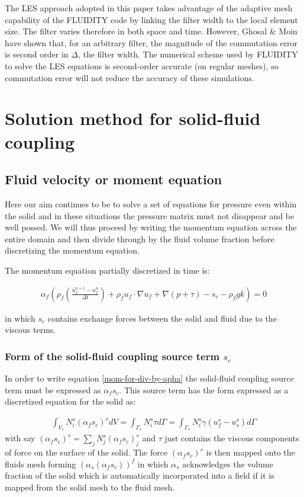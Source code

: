 The LES approach adopted in this paper takes advantage of the
adaptive mesh capability of the FLUIDITY code by linking the
filter width to the local element size. The filter varies
therefore in both space and time. However, Ghosal \& Moin
\cite{GnM95} have shown that, for an arbitrary filter, the
magnitude of the commutation error is second order in $\Delta$,
the filter width. The numerical scheme used by FLUIDITY to solve
the LES equations is second-order accurate (on regular meshes), so
commutation error will not reduce the accuracy of these
simulations.




\section{Solution method for solid-fluid coupling} 



\subsection{Fluid velocity or moment equation} 
Here our aim continues to be to solve a set of equations 
for pressure even within the solid and in these situations 
the pressure matrix must not disappear and be well possed. 
We will thus proceed by writing the momentum equation 
across the entire domain and then divide through by the 
fluid volume fraction before discretizing the momentum equation. 

The momentum equation partially discretized in time is:

\begin{eqnarray}
\alpha_f ( \rho_f (\frac{u_f^{n+1}-u_f^n}{\Delta t})
+ \rho_f u_f\cdot \nabla u_f 
+\nabla (p+\tau)  -s_c -\rho_f g k)=0
\label{mom-for-div-by-apha}
\end{eqnarray}

in which $s_c$ contains exchange forces between the 
solid and fluid due to the viscous terms. 

\subsubsection{Form of the solid-fluid coupling source term $s_c$}
In order to write equation \ref{mom-for-div-by-apha} 
the solid-fluid coupling source term must be expressed 
as $\alpha_f s_c$. 
This source term has the form expressed as a discretized equation 
for the solid as: 

\begin{eqnarray}
\int_{V_s} N_i^s (\alpha_f s_c)^s dV= \int_{\Gamma_s} N_i^s \tau d\Gamma = \int_{\Gamma_s} N_i^s \gamma (u^s_f - u^s_s) d\Gamma
\end{eqnarray}
with say $(\alpha_f s_c)^s=\sum_j N_j^s (\alpha_f s_c)^s_j$ 
and $\tau$ just contains the viscous components of force 
on the surface of the solid. The force $(\alpha_f s_c)^s$ is 
then mapped onto the fluids mesh forming $(\alpha_s(\alpha_f s_c))^f$ 
in which $\alpha_s$ acknowledges the volume fraction of the 
solid which is automatically incorporated into 
a field if it is mapped from the solid mesh 
to the fluid mesh. 

